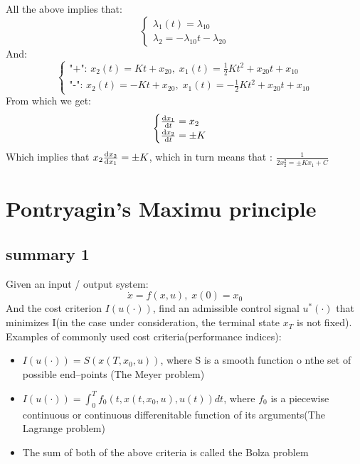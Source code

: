{    All the above implies that:
    \begin{equation}
        \begin{cases}
            \lambda_1(t) = \lambda_{10}\\
            \lambda_2 = -\lambda_{10}t - \lambda_{20}
        \end{cases}
    \end{equation}
    And:
    \begin{equation}
        \begin{cases}
            \text{"+": } x_2(t) = Kt +x_{20},\; x_1(t) = \frac{1}{2}Kt^{2}+x_{20}t + x_{10}\\
            \text{"-": } x_2(t) = -Kt +x_{20},\; x_1(t) = -\frac{1}{2}Kt^{2}+x_{20}t + x_{10}
        \end{cases}
    \end{equation}
    From which we get:
    \begin{equation}
        \begin{cases}
            \odv{x_1}{t} = x_2\\
            \odv{x_2}{t} = \pm K
        \end{cases}
    \end{equation}
    Which implies that $x_2 \odv{x_2}{x_1} = \pm K$, which in turn means that : $ \frac{1}{2 x_2^{2} = \pm K x_1+C}$
}

\section{Pontryagin's Maximu principle}
\subsection{summary 1}
Given an input / output system:
\begin{equation}
    \dot{x} = f(x,u),\; x(0) = x_0
\end{equation}
And the cost criterion $I(u(\cdot))$, find an admissible control signal $u^{*}(\cdot)$ that minimizes I(in the case under consideration, the terminal state $x_T$ is not fixed).
Examples of commonly used cost criteria(performance indices):
\begin{itemize}
        \item $I(u(\cdot)) = S(x(T,x_0,u))$, where S is a smooth function o nthe set of possible end--points (The Meyer problem)
        \item $I(u(\cdot)) = \int_0^{T}f_0(t,x(t,x_0,u),u(t))dt$, where $f_0$ is a piecewise continuous or continuous differenitable function of its arguments(The Lagrange problem)
        \item The sum of both of the above criteria is called the Bolza problem
        
\end{itemize}

